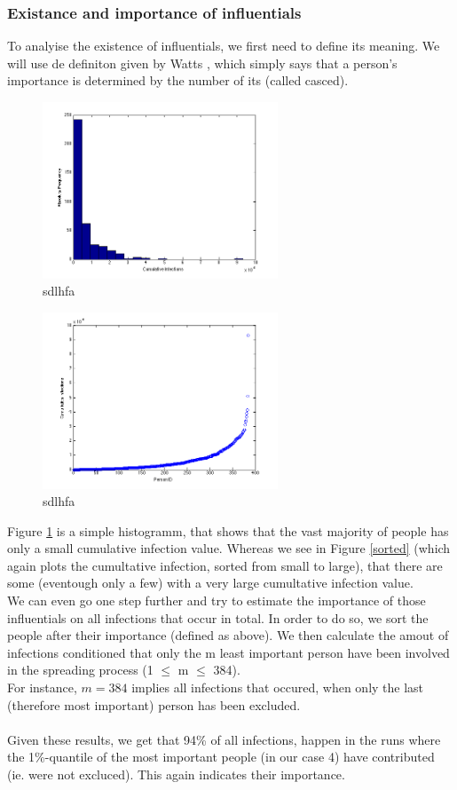\subsubsection{Existance and importance of influentials}


To analyise the existence of influentials, we first need to define its meaning. We will use de definiton given by Watts \cite{influentials}, which simply says that a person's importance is determined by the number of its  (called casced).

\begin{figure}[H!]
\includegraphics[width=7cm]{influ2}
\caption{sdlhfa}
\label{Histo}
\end{figure}

\begin{figure}[H!]
\includegraphics[width=7cm]{influ1}
\caption{sdlhfa}
\label{Sorted}
\end{figure}

Figure \ref{Histo} is a simple histogramm, that shows that the vast majority of people has only a small cumulative infection value. Whereas we see in Figure \ref{sorted} (which again plots the cumultative infection, sorted from small to large), that there are some (eventough only a few) with a very large cumultative infection value. \\

We can even go one step further and try to estimate the importance of those influentials on all infections that occur in total. In order to do so, we sort the people after their importance (defined as above). We then calculate the amout of infections conditioned that only the m least important person have been involved in the spreading process (1 $\le$ m $\le$ 384).\\
For instance, $m=384$ implies all infections that occured, when only the last (therefore most important) person has been excluded.\\
\\
Given these results, we get that 94\% of all infections, happen in the runs where the 1\%-quantile of the most important people (in our case 4) have contributed (ie. were not excluced). This again indicates their importance.

